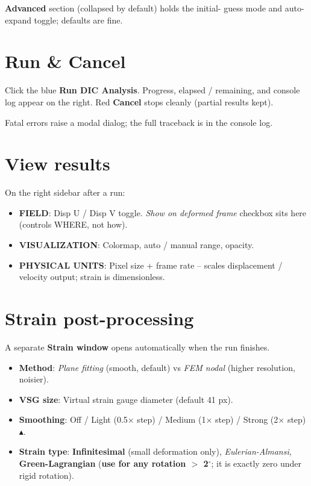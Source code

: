 \documentclass[10pt,letterpaper,twocolumn]{article}
\begin{document}
\textbf{Advanced} section (collapsed by default) holds the initial-
guess mode and auto-expand toggle; defaults are fine.

\section{Run \& Cancel}

Click the blue \textbf{Run DIC Analysis}. Progress, elapsed /
remaining, and console log appear on the right. Red
\textbf{Cancel} stops cleanly (partial results kept).

Fatal errors raise a modal dialog; the full traceback is in the
console log.

\section{View results}

On the right sidebar after a run:
\begin{itemize}
  \item \textbf{FIELD}: Disp U / Disp V toggle. \emph{Show on
        deformed frame} checkbox sits here (controls WHERE, not
        how).
  \item \textbf{VISUALIZATION}: Colormap, auto / manual range,
        opacity.
  \item \textbf{PHYSICAL UNITS}: Pixel size + frame rate -- scales
        displacement / velocity output; strain is dimensionless.
\end{itemize}

\section{Strain post-processing}

A separate \textbf{Strain window} opens automatically when the run
finishes.

\begin{itemize}
  \item \textbf{Method}: \emph{Plane fitting} (smooth, default) vs
        \emph{FEM nodal} (higher resolution, noisier).
  \item \textbf{VSG size}: Virtual strain gauge diameter
        (default 41 px).
  \item \textbf{Smoothing}: Off / Light (0.5$\times$ step) /
        Medium (1$\times$ step) / Strong (2$\times$ step)
        $\blacktriangle$.
  \item \textbf{Strain type}: \textbf{Infinitesimal} (small
        deformation only), \emph{Eulerian-Almansi},
        \textbf{Green-Lagrangian} (\textbf{use for any rotation
        $>$ 2$^\circ$}; it is exactly zero under rigid rotation).
\end{itemize}
\end{document}
